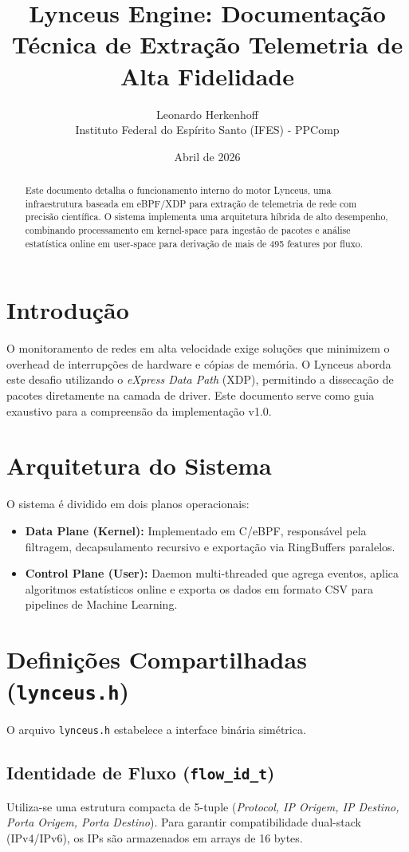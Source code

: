 \documentclass[a4paper,12pt]{article}
\title{Lynceus Engine: Documentação Técnica de Extração Telemetria de Alta Fidelidade}
\author{Leonardo Herkenhoff \\ \small Instituto Federal do Espírito Santo (IFES) - PPComp}
\date{Abril de 2026}
\begin{document}
\maketitle

\begin{abstract}
Este documento detalha o funcionamento interno do motor Lynceus, uma infraestrutura baseada em eBPF/XDP para extração de telemetria de rede com precisão científica. O sistema implementa uma arquitetura híbrida de alto desempenho, combinando processamento em kernel-space para ingestão de pacotes e análise estatística online em user-space para derivação de mais de 495 features por fluxo.
\end{abstract}

\tableofcontents

\newpage

\section{Introdução}
O monitoramento de redes em alta velocidade exige soluções que minimizem o overhead de interrupções de hardware e cópias de memória. O Lynceus aborda este desafio utilizando o \textit{eXpress Data Path} (XDP), permitindo a dissecação de pacotes diretamente na camada de driver. Este documento serve como guia exaustivo para a compreensão da implementação v1.0.

\section{Arquitetura do Sistema}
O sistema é dividido em dois planos operacionais:
\begin{itemize}
    \item \textbf{Data Plane (Kernel):} Implementado em C/eBPF, responsável pela filtragem, decapsulamento recursivo e exportação via RingBuffers paralelos.
    \item \textbf{Control Plane (User):} Daemon multi-threaded que agrega eventos, aplica algoritmos estatísticos online e exporta os dados em formato CSV para pipelines de Machine Learning.
\end{itemize}

\section{Definições Compartilhadas (\texttt{lynceus.h})}
O arquivo \texttt{lynceus.h} estabelece a interface binária simétrica.

\subsection{Identidade de Fluxo (\texttt{flow\_id\_t})}
Utiliza-se uma estrutura compacta de 5-tuple (\textit{Protocol, IP Origem, IP Destino, Porta Origem, Porta Destino}). Para garantir compatibilidade dual-stack (IPv4/IPv6), os IPs são armazenados em arrays de 16 bytes.
\end{document}
